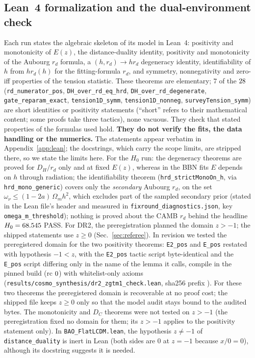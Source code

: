 \documentclass[11pt]{article}
\begin{document}
\subsection{Lean~4 formalization and the dual-environment check}\label{sec:lean}
Each run states the algebraic skeleton of its model in Lean~4: positivity and monotonicity of $E(z)$, the distance-duality identity,
positivity and monotonicity of the Aubourg $r_d$ formula, a $(h, r_d)\to hr_d$ degeneracy identity, identifiability of $h$
from $hr_d(h)$ for the fitting-formula $r_d$, and symmetry, nonnegativity and zero-iff properties of the tension statistic. These theorems are elementary; 7 of
the $28$ (\texttt{rd\_numerator\_pos}, \texttt{DH\_over\_rd\_eq\_hrd}, \texttt{DH\_over\_rd\_degenerate}, \texttt{gate\_reparam\_exact},
\texttt{tension1D\_symm}, \texttt{tension1D\_nonneg}, \texttt{surveyTension\_symm}) are short identities or positivity statements (``short'' refers to their mathematical content; some proofs take three tactics), none vacuous. They check
that stated properties of the formulas used hold. \textbf{They do not verify the fits, the data handling or the numerics.} The statements
appear verbatim in Appendix~\ref{app:lean}; the docstrings, which carry the scope limits, are stripped there, so we state the limits here.
For the $H_0$ run: the degeneracy theorems are proved for $D_H/r_d$ only and at fixed $E(z)$, whereas in the BBN fits $E$ depends on $h$ through
radiation; the identifiability theorem (\texttt{hrd\_strictMonoOn\_h}, via \texttt{hrd\_mono\_generic}) covers only the \emph{secondary} Aubourg $r_d$,
on the set $\omega_\nu\le(1-2a)\,\Omega_m h^2$, which excludes part of the sampled secondary prior (stated in the Lean file's header and measured in \texttt{fixround\_diagnostics.json}, key \texttt{omega\_m\_threshold}); nothing is proved about the CAMB $r_d$ behind the
headline $H_0=68.545$ PASS. For DR2, the preregistration planned the domain $z>-1$; the shipped statements use $z\ge0$ (Sec.~\ref{sec:referee}). In revision we tested the preregistered
domain for the two positivity theorems: \texttt{E2\_pos} and \texttt{E\_pos} restated with hypothesis $-1<z$, with the \texttt{E2\_pos} tactic script byte-identical and
the \texttt{E\_pos} script differing only in the name of the lemma it calls, compile in the pinned build (rc $0$) with whitelist-only axioms
(\texttt{results/cosmo\_synthesis/dr2\_zgtm1\_check.lean}, sha256 prefix \texttt{\zgSha}). For these two theorems the preregistered domain is recoverable at no proof
cost; the shipped file keeps $z\ge0$ only so that the model audit stays bound to the audited bytes. The monotonicity and $D_C$ theorems were not tested on $z>-1$ (the preregistration fixed no domain for them; its $z>-1$ applies to the positivity statement only).
In \texttt{BAO\_FlatLCDM.lean}, the hypothesis $z\neq-1$ of \texttt{distance\_duality} is inert in Lean (both sides are $0$ at $z=-1$ because
$x/0=0$), although its docstring suggests it is needed.
\end{document}

